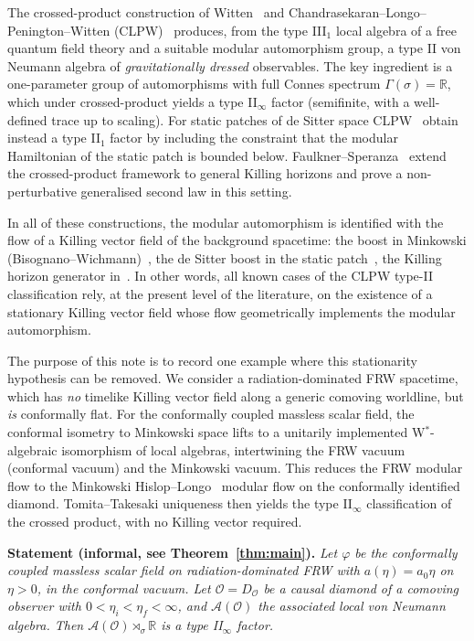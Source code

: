 \documentclass[11pt]{article}
\theoremstyle{definition}
\newcommand{\R}{\mathbb{R}}
\renewcommand{\AA}{\mathcal{A}}
\newcommand{\OO}{\mathcal{O}}
\begin{document}
The crossed-product construction of Witten~\cite{Witten2022} and Chandrasekaran--Longo--Penington--Witten (CLPW)~\cite{CLPW2023} produces, from the type III$_1$ local algebra of a free quantum field theory and a suitable modular automorphism group, a type II von Neumann algebra of \emph{gravitationally dressed} observables. The key ingredient is a one-parameter group of automorphisms with full Connes spectrum $\Gamma(\sigma)=\R$, which under crossed-product yields a type II$_\infty$ factor (semifinite, with a well-defined trace up to scaling). For static patches of de Sitter space CLPW~\cite{CLPW2023} obtain instead a type II$_1$ factor by including the constraint that the modular Hamiltonian of the static patch is bounded below. Faulkner--Speranza~\cite{FaulknerSperanza2024} extend the crossed-product framework to general Killing horizons and prove a non-perturbative generalised second law in this setting.

In all of these constructions, the modular automorphism is identified with the flow of a Killing vector field of the background spacetime: the boost in Minkowski (Bisognano--Wichmann)~\cite{BisognanoWichmann1975, BisognanoWichmann1976}, the de Sitter boost in the static patch~\cite{CLPW2023}, the Killing horizon generator in~\cite{FaulknerSperanza2024}. In other words, all known cases of the CLPW type-II classification rely, at the present level of the literature, on the existence of a stationary Killing vector field whose flow geometrically implements the modular automorphism.

The purpose of this note is to record one example where this stationarity hypothesis can be removed. We consider a radiation-dominated FRW spacetime, which has \emph{no} timelike Killing vector field along a generic comoving worldline, but \emph{is} conformally flat. For the conformally coupled massless scalar field, the conformal isometry to Minkowski space lifts to a unitarily implemented W$^*$-algebraic isomorphism of local algebras, intertwining the FRW vacuum (conformal vacuum) and the Minkowski vacuum. This reduces the FRW modular flow to the Minkowski Hislop--Longo~\cite{HislopLongo1982} modular flow on the conformally identified diamond. Tomita--Takesaki uniqueness then yields the type II$_\infty$ classification of the crossed product, with no Killing vector required.

\medskip

\noindent\textbf{Statement (informal, see Theorem~\ref{thm:main}).} \emph{Let $\varphi$ be the conformally coupled massless scalar field on radiation-dominated FRW with $a(\eta)=a_0\eta$ on $\eta>0$, in the conformal vacuum. Let $\OO=D_\OO$ be a causal diamond of a comoving observer with $0<\eta_i<\eta_f<\infty$, and $\AA(\OO)$ the associated local von Neumann algebra. Then $\AA(\OO)\rtimes_\sigma \R$ is a type II$_\infty$ factor.}
\end{document}
